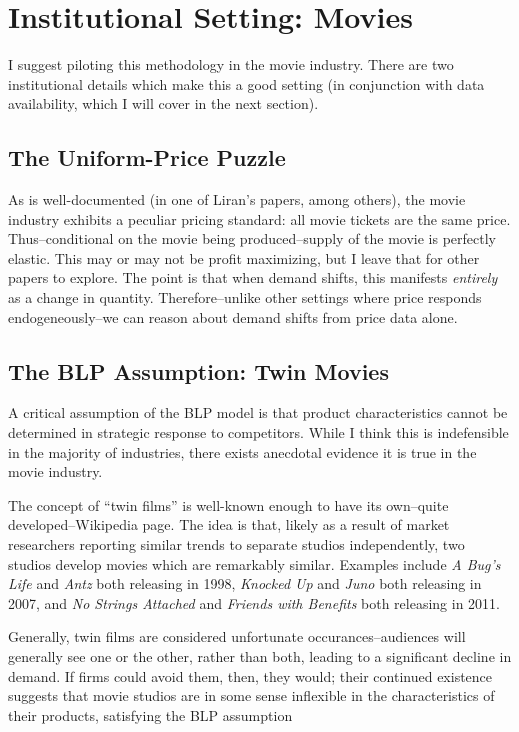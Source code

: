 \documentclass{article}
\begin{document}
\section{Institutional Setting: Movies}

I suggest piloting this methodology in the movie industry. There are two institutional details which make this a good setting (in conjunction with data availability, which I will cover in the next section). 

\subsection{The Uniform-Price Puzzle}

As is well-documented (in one of Liran's papers, among others), the movie industry exhibits a peculiar pricing standard: all movie tickets are the same price. Thus--conditional on the movie being produced--supply of the movie is perfectly elastic. This may or may not be profit maximizing, but I leave that for other papers to explore. The point is that when demand shifts, this manifests \emph{entirely} as a change in quantity. Therefore--unlike other settings where price responds endogeneously--we can reason about demand shifts from price data alone. 

\subsection{The BLP Assumption: Twin Movies}

A critical assumption of the BLP model is that product characteristics cannot be determined in strategic response to competitors. While I think this is indefensible in the majority of industries, there exists anecdotal evidence it is true in the movie industry. 

The concept of ``twin films'' is well-known enough to have its own--quite developed--Wikipedia page. The idea is that, likely as a result of market researchers reporting similar trends to separate studios independently, two studios develop movies which are remarkably similar. Examples include \emph{A Bug's Life} and \emph{Antz} both releasing in 1998, \emph{Knocked Up} and \emph{Juno} both releasing in 2007, and \emph{No Strings Attached} and \emph{Friends with Benefits} both releasing in 2011.

Generally, twin films are considered unfortunate occurances--audiences will generally see one or the other, rather than both, leading to a significant decline in demand. If firms could avoid them, then, they would; their continued existence suggests that movie studios are in some sense inflexible in the characteristics of their products, satisfying the BLP assumption
\end{document}
